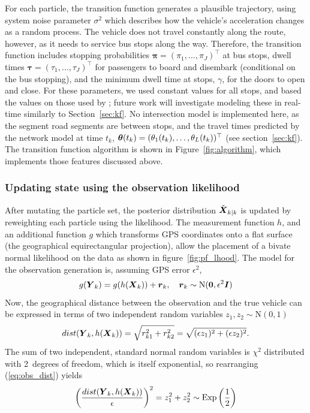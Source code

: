 For each particle, the transition function generates a plausible trajectory,
using system noise parameter $\sigma^2$ which describes 
how the vehicle's acceleration changes as a random process.
The vehicle does not travel constantly along the route,
however, as it needs to service bus stops along the way.
Therefore, the transition function includes 
stopping probabilities $\boldsymbol\pi = (\pi_1,\ldots,\pi_J)^\top$ at bus stops,
dwell times $\boldsymbol\tau = (\tau_1,\ldots,\tau_J)^\top$ for passengers to
board and disembark (conditional on the bus stopping),
and the minimum dwell time at stops, $\gamma$,
for the doors to open and close.
For these parameters, we used constant values for all stops,
and based the values on those used by \cite{Hans_2015};
future work will investigate modeling these in real-time similarly to Section~\ref{sec:kf}.
No intersection model is implemented here,
as the segment road segments are between stops,
and the travel times predicted by the network model at time $t_k$,
$\boldsymbol{\theta}(t_k) = (\theta_1(t_k), \ldots, \theta_L(t_k))^\top$
(see section~\ref{sec:kf}).
The transition function algorithm is shown in Figure~\ref{fig:algorithm},
which implements those features discussed above.



\subsubsection{Updating state using the observation likelihood}
\label{sec:pf_update}

After mutating the particle set, the posterior distribution $\tilde{\mbox{$\boldsymbol{X}$}}_{k|k}$ 
is updated by reweighting each particle using the likelihood.
The measurement function $h$,
and an additional function $g$ which transforms GPS coordinates onto a flat
surface (the geographical equirectangular projection),
allow the placement of a bivate normal likelihood on the data
as shown in figure~\ref{fig:pf_lhood}.
The model for the observation generation is,
assuming GPS error $\epsilon^2$,
\begin{equation}
\label{eq:pf_obs_model}
g(\mbox{$\boldsymbol{Y}$}_k) = g(h(\mbox{$\boldsymbol{X}$}_k)) + \boldsymbol{r}_k,
\quad \boldsymbol{r}_k \sim \mathrm{N}(\boldsymbol{0}, \epsilon^2\boldsymbol{I})
\end{equation}
Now, the geographical distance between the observation and the true vehicle can be expressed
in terms of two independent random variables $z_1, z_2 \sim \mathrm{N}(0,1)$
\begin{equation}
\label{eq:obs_dist}
dist(\mbox{$\boldsymbol{Y}$}_k, h(\mbox{$\boldsymbol{X}$}_k)) = \sqrt{r_{k1}^2 + r_{k2}^2} 
    = \sqrt{(\epsilon z_1)^2 + (\epsilon z_2)^2}.
\end{equation}
The sum of two independent, standard normal random variables 
is $\chi^2$ distributed with 2~degrees of freedom,
which is itself exponential,
so rearranging (\ref{eq:obs_dist}) yields
\begin{equation}
\label{eq:obs_exp}
\left(\frac{dist(\mbox{$\boldsymbol{Y}$}_k, h(\mbox{$\boldsymbol{X}$}_k))}{\epsilon}\right)^2 =
z_1^2 + z_2^2 \sim \mathrm{Exp}\left(\frac{1}{2}\right)
\end{equation}


